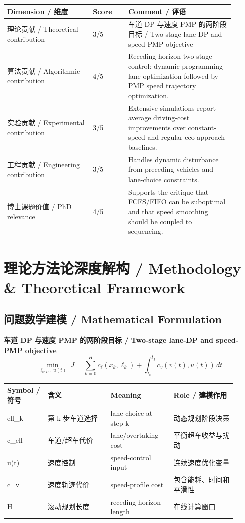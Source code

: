 \documentclass[UTF8,a4paper,11pt,fontset=fandol]{ctexart}
\begin{document}
\begin{longtable}{p{0.34\linewidth}p{0.14\linewidth}p{0.42\linewidth}}
\toprule
Dimension / 维度 & Score & Comment / 评语\\
\midrule
理论贡献 / Theoretical contribution & 3/5 & 车道 DP 与速度 PMP 的两阶段目标 / Two-stage lane-DP and speed-PMP objective \\
算法贡献 / Algorithmic contribution & 4/5 & Receding-horizon two-stage control: dynamic-programming lane optimization followed by PMP speed trajectory optimization. \\
实验贡献 / Experimental contribution & 3/5 & Extensive simulations report average driving-cost improvements over constant-speed and regular eco-approach baselines. \\
工程贡献 / Engineering contribution & 3/5 & Handles dynamic disturbance from preceding vehicles and lane-choice constraints. \\
博士课题价值 / PhD relevance & 4/5 & Supports the critique that FCFS/FIFO can be suboptimal and that speed smoothing should be coupled to sequencing. \\
\bottomrule
\end{longtable}

\section{理论方法论深度解构 / Methodology \& Theoretical Framework}
\subsection{问题数学建模 / Mathematical Formulation}
\textbf{车道 DP 与速度 PMP 的两阶段目标 / Two-stage lane-DP and speed-PMP objective}
\[
\min_{\ell_{0:H},\,u(t)}\; J=\sum_{k=0}^{H} c_{\ell}(x_k,\ell_k)+\int_{t_0}^{t_f} c_v(v(t),u(t))\,dt
\]
\begin{longtable}{p{0.16\linewidth}p{0.25\linewidth}p{0.25\linewidth}p{0.25\linewidth}}
\toprule
Symbol / 符号 & 含义 & Meaning & Role / 建模作用\\
\midrule
ell\_k & 第 k 步车道选择 & lane choice at step k & 动态规划阶段决策 \\
c\_ell & 车道/超车代价 & lane/overtaking cost & 平衡超车收益与扰动 \\
u(t) & 速度控制 & speed-control input & 连续速度优化变量 \\
c\_v & 速度轨迹代价 & speed-profile cost & 包含能耗、时间和平滑性 \\
H & 滚动规划长度 & receding-horizon length & 在线计算窗口 \\
\bottomrule
\end{longtable}
\end{document}
